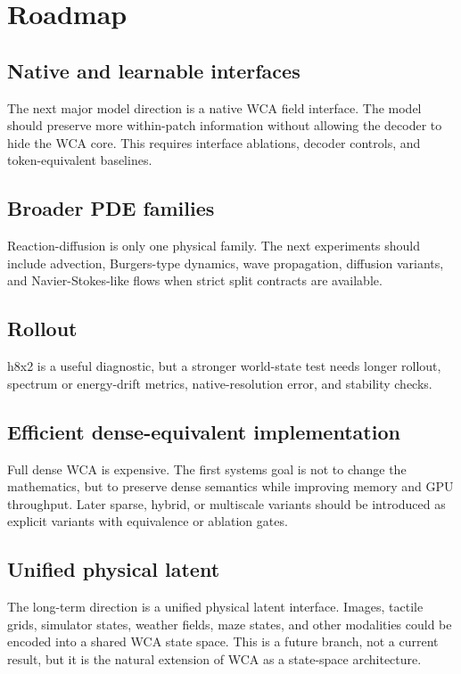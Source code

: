 \documentclass[11pt]{article}
\begin{document}
\section{Roadmap}

\subsection{Native and learnable interfaces}

The next major model direction is a native WCA field interface. The model
should preserve more within-patch information without allowing the decoder to
hide the WCA core. This requires interface ablations, decoder controls, and
token-equivalent baselines.

\subsection{Broader PDE families}

Reaction-diffusion is only one physical family. The next experiments should
include advection, Burgers-type dynamics, wave propagation, diffusion variants,
and Navier-Stokes-like flows when strict split contracts are available.

\subsection{Rollout}

h8x2 is a useful diagnostic, but a stronger world-state test needs longer
rollout, spectrum or energy-drift metrics, native-resolution error, and
stability checks.

\subsection{Efficient dense-equivalent implementation}

Full dense WCA is expensive. The first systems goal is not to change the
mathematics, but to preserve dense semantics while improving memory and GPU
throughput. Later sparse, hybrid, or multiscale variants should be introduced
as explicit variants with equivalence or ablation gates.

\subsection{Unified physical latent}

The long-term direction is a unified physical latent interface. Images,
tactile grids, simulator states, weather fields, maze states, and other
modalities could be encoded into a shared WCA state space. This is a future
branch, not a current result, but it is the natural extension of WCA as a
state-space architecture.
\end{document}
